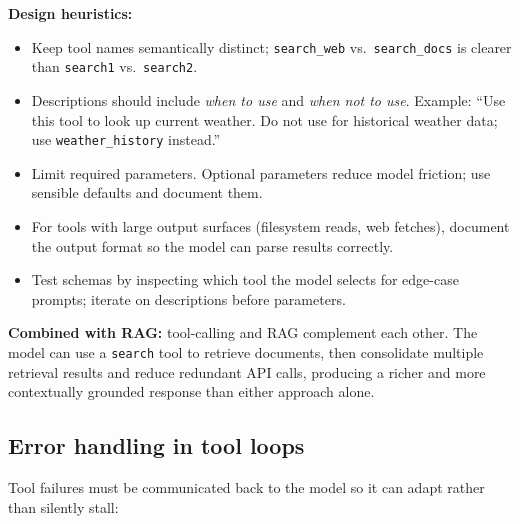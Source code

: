 \textbf{Design heuristics:}
\begin{itemize}
  \item Keep tool names semantically distinct; \texttt{search\_web} vs.\
    \texttt{search\_docs} is clearer than \texttt{search1} vs.\ \texttt{search2}.
  \item Descriptions should include \emph{when to use} and \emph{when not to use}.
    Example: ``Use this tool to look up current weather. Do not use for historical
    weather data; use \texttt{weather\_history} instead.''
  \item Limit required parameters. Optional parameters reduce model friction; use
    sensible defaults and document them.
  \item For tools with large output surfaces (filesystem reads, web fetches), document
    the output format so the model can parse results correctly.
  \item Test schemas by inspecting which tool the model selects for edge-case prompts;
    iterate on descriptions before parameters.
\end{itemize}

\textbf{Combined with RAG:} tool-calling and RAG complement each other. The model
can use a \texttt{search} tool to retrieve documents, then consolidate multiple
retrieval results and reduce redundant API calls, producing a richer and more
contextually grounded response than either approach alone.

\subsection{Error handling in tool loops}

Tool failures must be communicated back to the model so it can adapt rather than
silently stall:

